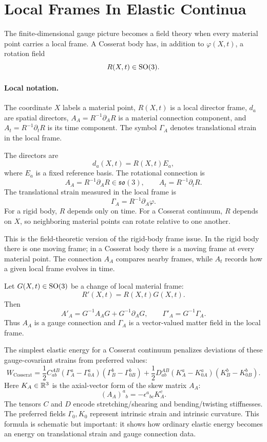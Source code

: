 \section{Local Frames In Elastic Continua}
\label{sec:local-frames-elastic-continua}

The finite-dimensional gauge picture becomes a field theory when every material
point carries a local frame. A Cosserat body has, in addition to
\(\varphi(X,t)\), a rotation field
\[
  R(X,t)\in\operatorname{SO}(3).
\]

\paragraph{Local notation.}
The coordinate \(X\) labels a material point, \(R(X,t)\) is a local director
frame, \(d_a\) are spatial directors, \(A_A=R^{-1}\partial_A R\) is a material
connection component, and \(A_t=R^{-1}\partial_tR\) is its time component.  The
symbol \(\Gamma_A\) denotes translational strain in the local frame.

The directors are
\[
  d_a(X,t)=R(X,t)E_a,
\]
where \(E_a\) is a fixed reference basis. The rotational connection is
\[
  A_A=R^{-1}\partial_A R\in\mathfrak{so}(3),
  \qquad
  A_t=R^{-1}\partial_t R.
\]
The translational strain measured in the local frame is
\[
  \Gamma_A=R^{-1}\partial_A\varphi.
\]
For a rigid body, \(R\) depends only on time. For a Cosserat continuum, \(R\)
depends on \(X\), so neighboring material points can rotate relative to one
another.

This is the field-theoretic version of the rigid-body frame issue. In the
rigid body there is one moving frame; in a Cosserat body there is a moving frame
at every material point. The connection \(A_A\) compares nearby frames, while
\(A_t\) records how a given local frame evolves in time.

\begin{definition}
Let \(G(X,t)\in\operatorname{SO}(3)\) be a change of local material frame:
\[
  R'(X,t)=R(X,t)G(X,t).
\]
Then
\[
  A'_A=G^{-1}A_AG+G^{-1}\partial_A G,
  \qquad
  \Gamma'_A=G^{-1}\Gamma_A.
\]
Thus \(A_A\) is a gauge connection and \(\Gamma_A\) is a vector-valued
matter field in the local frame.
\end{definition}

The simplest elastic energy for a Cosserat continuum penalizes deviations of
these gauge-covariant strains from preferred values:
\[
  W_{\mathrm{Cosserat}}
  =
  \frac12 C^{AB}_{ab}
  \left(\Gamma_A^a-\Gamma_{0A}^a\right)
  \left(\Gamma_B^b-\Gamma_{0B}^b\right)
  +
  \frac12 D^{AB}_{ab}
  \left(K_A^a-K_{0A}^a\right)
  \left(K_B^b-K_{0B}^b\right).
\]
Here \(K_A\in\mathbb{R}^3\) is the axial-vector form of the skew matrix \(A_A\):
\[
  (A_A)^a{}_b=-\epsilon^a{}_{bc}K_A^c.
\]
The tensors \(C\) and \(D\) encode stretching/shearing and bending/twisting
stiffnesses. The preferred fields \(\Gamma_0,K_0\) represent intrinsic strain
and intrinsic curvature. This formula is schematic but important: it shows how
ordinary elastic energy becomes an energy on translational strain and gauge
connection data.

